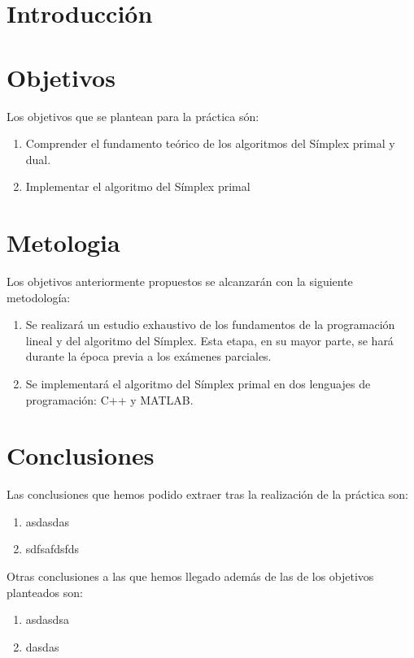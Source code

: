 \documentclass[12pt, titlepage]{article}
\begin{document}
\section{Introducción}
\section{Objetivos}
Los objetivos que se plantean para la práctica són:
\begin{enumerate}
\item	Comprender el fundamento teórico de los algoritmos del Símplex primal y dual.
\item	Implementar el algoritmo del Símplex primal
\end{enumerate}
\section{Metologia}
Los objetivos anteriormente propuestos se alcanzarán con la siguiente metodología:
\begin{enumerate}
\item	Se realizará un estudio exhaustivo de los fundamentos de la programación lineal y del algoritmo del Símplex. Esta etapa, en su mayor parte, se hará durante la época previa a los exámenes parciales.
\item	Se implementará el algoritmo del Símplex primal en dos lenguajes de programación: C++ y MATLAB.
\end{enumerate}
\section{Conclusiones}
Las conclusiones que hemos podido extraer tras la realización de la práctica son:
\begin{enumerate}
\item	asdasdas
\item	sdfsafdsfds
\end{enumerate}
Otras conclusiones a las que hemos llegado además de las de los objetivos planteados son:
\begin{enumerate}
\item	asdasdsa
\item	dasdas
\end{enumerate}
	
\end{document}
